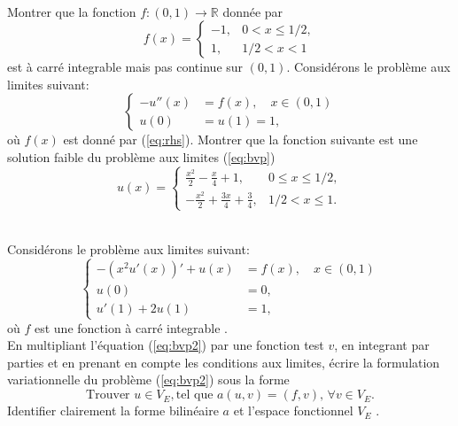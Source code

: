 \documentclass[12pt,a4paper]{article}
\begin{document}
 \\ 
Montrer que la fonction $f: (0,1)\rightarrow \mathbb{R}$ donnée par
 \begin{equation}\label{eq:rhs}
 f(x) = \left\{\begin{array}{rl}
 -1,& 0 <  x\le 1/2,\\
 1, &1/2 <x < 1
 \end{array}\right.
 \end{equation}
est à carré integrable mais pas continue sur $(0,1)$.
Considérons le problème aux limites suivant:
 \begin{equation}\label{eq:bvp}
\left\{\begin{array}{rl}
-u''(x) &= f(x), \quad x\in (0,1)\\
 u(0) &= u(1) = 1,
 \end{array}\right.
 \end{equation}
 où $f(x)$ est donné par (\ref{eq:rhs}). 
Montrer que la fonction suivante est une solution faible du problème aux limites (\ref{eq:bvp}) 
\begin{equation}\label{eq:sol}
 u(x) = \left\{\begin{array}{rl}
 \frac{x^2}{2} -\frac{x}{4}+1, & 0 \le  x\le 1/2,\\
 -\frac{x^2}{2}+\frac{3x}{4}+\frac{3}{4}, & 1/2 <x \le 1.
 \end{array}\right.
 \end{equation}


 \\ 
Considérons le problème aux limites suivant:
 \begin{equation}\label{eq:bvp2}
\left\{\begin{array}{rl}
-(x^2 u'(x))' + u(x) &= f(x), \quad x\in (0,1)\\
 u(0) &= 0 ,\\
 u'(1) + 2 u(1) &= 1,
 \end{array}\right.
 \end{equation}
 où $f$ est une fonction à carré integrable .\\
En multipliant l'équation (\ref{eq:bvp2}) par une fonction test $v$, en integrant par parties et en prenant en compte les conditions aux limites, écrire la formulation variationnelle du problème (\ref{eq:bvp2}) sous la forme
$$
\mbox{Trouver } u\in V_E, \mbox{tel que } a(u,v) = (f,v),\, \forall v\in V_E.
$$
Identifier clairement la forme bilinéaire $a$ et l'espace fonctionnel $V_E$ .
\end{document}
